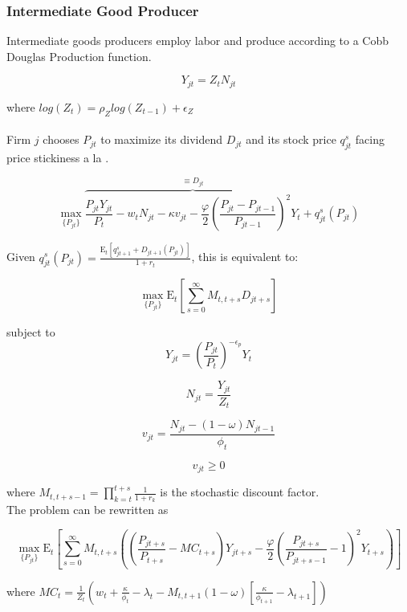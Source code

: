 \documentclass[titlepage]{\econtex}\providecommand{\texname}{Dissertation-Proposal}
\begin{document}
\hypertarget{Intermediate Good Producer}{}
\subsubsection{Intermediate Good Producer}

Intermediate goods producers employ labor and produce according to a Cobb Douglas Production function. 

$$Y_{jt} =  Z_{t}  N_{jt}$$ 

where $log(Z_{t}) = \rho_{Z} log( Z_{t-1}) + \epsilon_{Z}$ \\ \\

  
 
 Firm $j$ chooses $P_{jt}$ to maximize its dividend $D_{jt}$ and its stock price $q^{s}_{jt} $ facing price stickiness a la \cite{rotemberg1982sticky}.
 
  
  $$\max_{\{P_{jt}\}} \overbrace{\frac{P_{jt}Y_{jt}}{P_{t}} - w_{t} N_{jt} - \kappa v_{jt} -  \frac{\varphi}{2}\left( \frac{P_{jt} - P_{jt-1}}{P_{jt-1}} \right)^{2} Y_{t} }^{ \equiv D_{jt}} + q^{s}_{jt}\left(P_{jt}\right) $$

  
Given $q^{s}_{jt}\left(P_{jt}\right) = \frac{\mathrm{E}_{t}\left[q^{s}_{jt+1} + D_{jt+1}\left(P_{jt}\right)\right]}{1+r_{t}}$,  this is equivalent to: 
 
 $$\max_{\{P_{jt}\}} \mathrm{E}_{t}\left[\sum_{s=0}^{\infty}  M_{t,t+s}D_{jt+s} \right]$$
 
subject to $$Y_{jt} = \left(\frac {P_{jt}}{P_{t}}\right)^{- \epsilon_{p}} Y_{t}$$

$$ N_{jt} =  \frac{Y_{jt}} {Z_{t}} $$ 


$$ v_{jt} =  \frac{ N_{jt} - (1-\omega)N_{jt-1}}{\phi_{t}} $$

$$ v_{jt} \geq 0$$
 
where $M_{t, t+s-1} = \prod_{k=t}^{t+s} \frac{1}{1+r_{k}}$ is the stochastic discount factor. \\

The problem can be rewritten as 

$$\max_{\{P_{jt}\}} \mathrm{E}_{t}\left[\sum_{s=0}^{\infty}  M_{t,t+s} \left( \left( \frac{P_{jt+s}}{P_{t+s}} - MC_{t+s}\right)Y_{jt+s} -  \frac{\varphi}{2}\left( \frac{P_{jt+s}}{P_{jt+s-1}} - 1\right)^{2} Y_{t+s} \right)\right]$$


where $MC_{t} = \frac{1}{Z_{t}} \left( w_{t} + \frac{\kappa}{\phi_{t}} - \lambda_{t} - M_{t,t+1} (1-\omega) \left[  \frac{\kappa}{\phi_{t+1}} - \lambda_{t+1} \right] \right)$ \\
\end{document}
